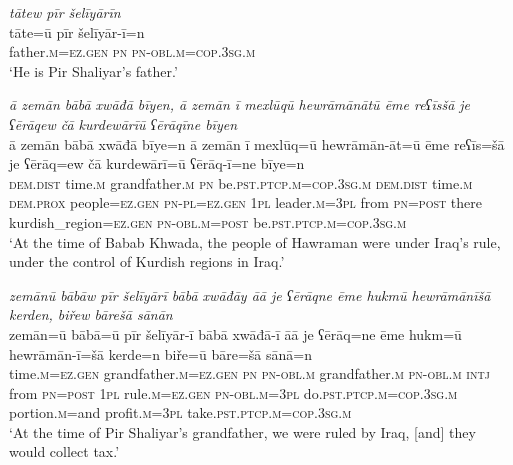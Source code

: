\ea \label{BP.8}
\textit{tātew pīr šelīyārīn} \\ 
\gll tāte=ū pīr šelīyār-ī=n \\ 
 father\textsc{.m}\textsc{=ez.gen} \textsc{pn} \textsc{pn}\textsc{-obl}\textsc{.m}\textsc{=cop}\textsc{.3sg}\textsc{.m} \\ 
\glt `He is Pir Shaliyar’s father.'
\z 
 
\ea \label{BP.9}
\textit{ā zemān bābā xwāđā bīyen, ā zemān ī mexlūqū hewrāmānātū ēme reʕīsšā je ʕērāqew čā kurdewārīū ʕērāqīne bīyen} \\ 
\gll ā zemān bābā xwāđā bīye=n ā zemān ī mexlūq=ū hewrāmān-āt=ū ēme reʕīs=šā je ʕērāq=ew čā kurdewārī=ū ʕērāq-ī=ne bīye=n \\ 
 \textsc{dem.dist} time\textsc{.m} grandfather\textsc{.m} \textsc{pn} be\textsc{.pst}\textsc{.ptcp}\textsc{.m}\textsc{=cop}\textsc{.3sg}\textsc{.m} \textsc{dem.dist} time\textsc{.m} \textsc{dem.prox} people\textsc{=ez.gen} \textsc{pn}\textsc{\textsc{-pl}}\textsc{=ez.gen} \textsc{1pl} leader\textsc{.m}\textsc{=3pl} from \textsc{pn}\textsc{=\textsc{post}} there kurdish\_region\textsc{=ez.gen} \textsc{pn}\textsc{-obl}\textsc{.m}\textsc{=\textsc{post}} be\textsc{.pst}\textsc{.ptcp}\textsc{.m}\textsc{=cop}\textsc{.3sg}\textsc{.m} \\ 
\glt `At the time of Babab Khwada, the people of Hawraman were under Iraq’s rule, under the control of Kurdish regions in Iraq.'
\z 
 
\ea \label{BP.11}
\textit{zemānū bābāw pīr šelīyārī bābā xwāđāy āā je ʕērāqne ēme hukmū hewrāmānīšā kerden, biřew bārešā sānān} \\ 
\gll zemān=ū bābā=ū pīr šelīyār-ī bābā xwāđā-ī āā je ʕērāq=ne ēme hukm=ū hewrāmān-ī=šā kerde=n biře=ū bāre=šā sānā=n \\ 
 time\textsc{.m}\textsc{=ez.gen} grandfather\textsc{.m}\textsc{=ez.gen} \textsc{pn} \textsc{pn}\textsc{-obl}\textsc{.m} grandfather\textsc{.m} \textsc{pn}\textsc{-obl}\textsc{.m} \textsc{intj} from \textsc{pn}\textsc{=\textsc{post}} \textsc{1pl} rule\textsc{.m}\textsc{=ez.gen} \textsc{pn}\textsc{-obl}\textsc{.m}\textsc{=3pl} do\textsc{.pst}\textsc{.ptcp}\textsc{.m}\textsc{=cop}\textsc{.3sg}\textsc{.m} portion\textsc{.m}=and profit\textsc{.m}\textsc{=3pl} take\textsc{.pst}\textsc{.ptcp}\textsc{.m}\textsc{=cop}\textsc{.3sg}\textsc{.m} \\ 
\glt `At the time of Pir Shaliyar’s grandfather, we were ruled by Iraq, [and] they would collect tax.'
\z 
 
